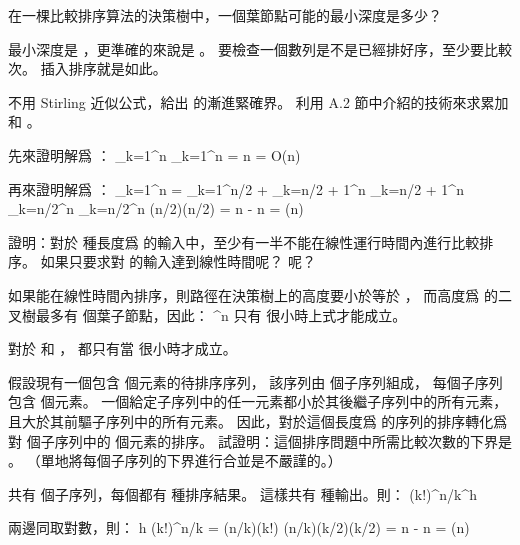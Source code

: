 \startsection[
  title={Lower bounds for sorting},
  reference=section:lower_bound_sorting,
]

\startEXERCISE
在一棵比較排序算法的決策樹中，一個葉節點可能的最小深度是多少？
\stopEXERCISE

\startANSWER
最小深度是 ，更準確的來說是 。
要檢查一個數列是不是已經排好序，至少要比較  次。
插入排序就是如此。
\stopANSWER

不用 Stirling 近似公式，給出  的漸進緊確界。
利用 A.2 節中介紹的技術來求累加和 。
\stopEXERCISE

\startANSWER
先來證明解爲 ：
\startformula
\sum_{k=1}^n \le \sum_{k=1}^n = n = O(n)
\stopformula

再來證明解爲 ：
\startformula\startmathalignment
\NC \sum_{k=1}^n
   \NC= \sum_{k=1}^{\lfloor n/2 \rfloor} +
	\sum_{k=\lfloor n/2 \rfloor + 1}^n \NR
\NC\NC\ge \sum_{k=\lfloor n/2 \rfloor + 1}^n \NR
\NC\NC\ge \sum_{k=n/2}^n \NR
\NC\NC\ge \sum_{k=n/2}^n \NR
\NC\NC\ge (n/2)\lg(n/2) \NR
\NC\NC= n - n \NR
\NC\NC= \Omega(n) \NR
\stopmathalignment\stopformula
\stopANSWER

\startEXERCISE
證明：對於  種長度爲  的輸入中，至少有一半不能在線性運行時間內進行比較排序。
如果只要求對  的輸入達到線性時間呢？  呢？
\stopEXERCISE

\startANSWER
如果能在線性時間內排序，則路徑在決策樹上的高度要小於等於 ，
而高度爲  的二叉樹最多有  個葉子節點，因此：
\startformula
{} ^n
\stopformula
只有  很小時上式才能成立。

對於  和 ，
都只有當  很小時才成立。
\stopANSWER

\startEXERCISE
假設現有一個包含  個元素的待排序序列，
該序列由  個子序列組成，
每個子序列包含  個元素。
一個給定子序列中的任一元素都小於其後繼子序列中的所有元素，
且大於其前驅子序列中的所有元素。
因此，對於這個長度爲  的序列的排序轉化爲對  個子序列中的  個元素的排序。
試證明：這個排序問題中所需比較次數的下界是 。
（\hint 單地將每個子序列的下界進行合並是不嚴謹的。）
\stopEXERCISE

\startANSWER
共有  個子序列，每個都有  種排序結果。
這樣共有  種輸出。則：
\startformula
(k!)^{n/k}^h
\stopformula

兩邊同取對數，則：
\startformula\startmathalignment
\NC h
   \NC\ge \lg(k!)^{n/k} \NR
\NC\NC=   (n/k)\lg(k!) \NR
\NC\NC\ge (n/k)(k/2)\lg(k/2) \qquad {}\NR
\NC\NC=   n - n \NR
\NC\NC=   \Omega(n) \NR
\stopmathalignment\stopformula
\stopANSWER

\stopsection
